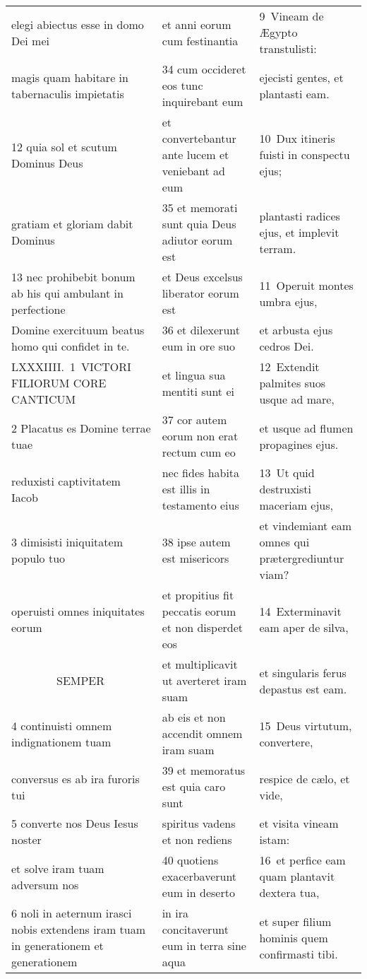\documentclass{article}
\begin{document}
\begin{longtable}{@{}p{}p{}p{}@{}}
elegi abiectus esse in domo Dei mei	&	et anni eorum cum festinantia	&	9 Vineam de Ægypto transtulisti:	\\
magis quam habitare in tabernaculis impietatis	&	34 cum occideret eos tunc inquirebant eum	&	ejecisti gentes, et plantasti eam.	\\
12 quia sol et scutum Dominus Deus	&	et convertebantur ante lucem et veniebant ad eum	&	10 Dux itineris fuisti in conspectu ejus;	\\
gratiam et gloriam dabit Dominus	&	35 et memorati sunt quia Deus adiutor eorum est	&	plantasti radices ejus, et implevit terram.	\\
13 nec prohibebit bonum ab his qui ambulant in perfectione	&	et Deus excelsus liberator eorum est	&	11 Operuit montes umbra ejus,	\\
Domine exercituum beatus homo qui confidet in te.	&	36 et dilexerunt eum in ore suo	&	et arbusta ejus cedros Dei.	\\
LXXXIIII. 1 VICTORI FILIORUM CORE CANTICUM	&	et lingua sua mentiti sunt ei	&	12 Extendit palmites suos usque ad mare,	\\
2 Placatus es Domine terrae tuae	&	37 cor autem eorum non erat rectum cum eo	&	et usque ad flumen propagines ejus.	\\
reduxisti captivitatem Iacob	&	nec fides habita est illis in testamento eius	&	13 Ut quid destruxisti maceriam ejus,	\\
3 dimisisti iniquitatem populo tuo	&	38 ipse autem est misericors	&	et vindemiant eam omnes qui prætergrediuntur viam?	\\
operuisti omnes iniquitates eorum	&	et propitius fit peccatis eorum et non disperdet eos	&	14 Exterminavit eam aper de silva,	\\
    SEMPER	&	et multiplicavit ut averteret iram suam	&	et singularis ferus depastus est eam.	\\
4 continuisti omnem indignationem tuam	&	ab eis et non accendit omnem iram suam	&	15 Deus virtutum, convertere,	\\
conversus es ab ira furoris tui	&	39 et memoratus est quia caro sunt	&	respice de cælo, et vide,	\\
5 converte nos Deus Iesus noster	&	spiritus vadens et non rediens	&	et visita vineam istam:	\\
et solve iram tuam adversum nos	&	40 quotiens exacerbaverunt eum in deserto	&	16 et perfice eam quam plantavit dextera tua,	\\
6 noli in aeternum irasci nobis extendens iram tuam in generationem et generationem	&	in ira concitaverunt eum in terra sine aqua	&	et super filium hominis quem confirmasti tibi.	\\

\end{longtable}
\end{document}
